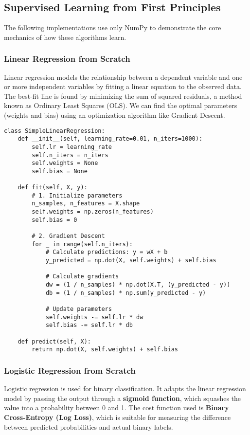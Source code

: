 \documentclass[11pt,a4paper]{article}
\begin{document}
\subsection{Supervised Learning from First Principles}

The following implementations use only NumPy to demonstrate the core mechanics of how these algorithms learn.

\subsubsection{Linear Regression from Scratch}

Linear regression models the relationship between a dependent variable and one or more independent variables by fitting a linear equation to the observed data. The best-fit line is found by minimizing the sum of squared residuals, a method known as Ordinary Least Squares (OLS). We can find the optimal parameters (weights and bias) using an optimization algorithm like Gradient Descent.

\begin{lstlisting}
class SimpleLinearRegression:
    def __init__(self, learning_rate=0.01, n_iters=1000):
        self.lr = learning_rate
        self.n_iters = n_iters
        self.weights = None
        self.bias = None

    def fit(self, X, y):
        # 1. Initialize parameters
        n_samples, n_features = X.shape
        self.weights = np.zeros(n_features)
        self.bias = 0

        # 2. Gradient Descent
        for _ in range(self.n_iters):
            # Calculate predictions: y = wX + b
            y_predicted = np.dot(X, self.weights) + self.bias

            # Calculate gradients
            dw = (1 / n_samples) * np.dot(X.T, (y_predicted - y))
            db = (1 / n_samples) * np.sum(y_predicted - y)

            # Update parameters
            self.weights -= self.lr * dw
            self.bias -= self.lr * db

    def predict(self, X):
        return np.dot(X, self.weights) + self.bias
\end{lstlisting}

\subsubsection{Logistic Regression from Scratch}

Logistic regression is used for binary classification. It adapts the linear regression model by passing the output through a \textbf{sigmoid function}, which squashes the value into a probability between 0 and 1. The cost function used is \textbf{Binary Cross-Entropy (Log Loss)}, which is suitable for measuring the difference between predicted probabilities and actual binary labels.
\end{document}
